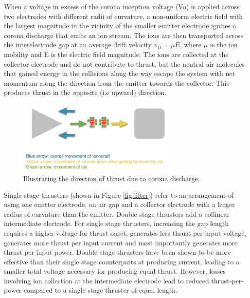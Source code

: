 \documentclass[11pt]{article}
\begin{document}
When a voltage in excess of the corona inception voltage (Vo) is applied across two electrodes with different radii of curvature, a non-uniform electric field with the largest magnitude in the vicinity of the smaller emitter electrode ignites a corona discharge that emits an ion stream. The ions are then transported across the interelectrode gap at an average drift velocity $v_D = \mu E$, where $\mu$ is the ion mobility and E is the electric field magnitude. The ions are collected at the collector electrode and do not contribute to thrust, but the neutral air molecules that gained energy in the collisions along the way escape the system with net momentum along the direction from the emitter towards the collector. This produces thrust in the opposite (i.e upward) direction.\\

\begin{figure}[h!]
\centering
\includegraphics[width= 0.7\textwidth]{corona_3}
\caption{\label{fig:corona_2} Illustrating the direction of thrust due to corona discharge. \cite{workshop}}
\end{figure}

Single stage thrusters (shown in Figure \ref{fig:lifter}) refer to an arrangement of using one emitter electrode, an air gap and a collector electrode with a larger radius of curvature than the emitter. Double stage thrusters add a collinear intermediate electrode. For single stage thrusters, increasing the gap length requires a higher voltage for thrust onset, generates less thrust per input voltage, generates more thrust per input current and most importantly generates more thrust per input power. Double stage thrusters have been shown to be more effective than their single stage counterparts at producing current, leading to a smaller total voltage necessary for producing equal thrust. However, losses involving ion collection at the intermediate electrode lead to reduced thrust-per-power compared to a single stage thruster of equal length.\\
\end{document}
